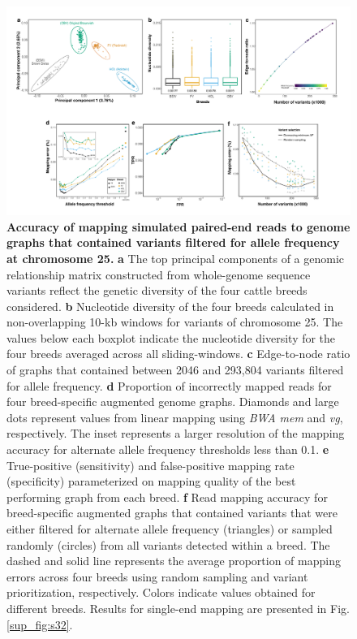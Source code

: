 \documentclass[../main.tex]{subfiles}
\begin{document}
\begin{figure}[!htb]
    \centering
    \includegraphics[width=\textwidth]{paper2/main_figure/Fig2.pdf}
    \caption[Affect allele frequency on graph mapping accuracy]{\textbf{Accuracy of mapping simulated paired-end reads to genome graphs that contained variants filtered for allele frequency at chromosome 25.} 
    \small{\textbf{a} The top principal components of a genomic relationship matrix constructed from whole-genome sequence variants reflect the genetic diversity of the four cattle breeds considered. \textbf{b} Nucleotide diversity of the four breeds calculated in non-overlapping 10-kb windows for variants of chromosome 25. The values below each boxplot indicate the nucleotide diversity for the four breeds averaged across all sliding-windows. \textbf{c} Edge-to-node ratio of graphs that contained between 2046 and 293,804 variants filtered for allele frequency. \textbf{d} Proportion of incorrectly mapped reads for four breed-specific augmented genome graphs. Diamonds and large dots represent values from linear mapping using \emph{BWA mem} and \emph{vg}, respectively. The inset represents a larger resolution of the mapping accuracy for alternate allele frequency thresholds less than 0.1. \textbf{e} True-positive (sensitivity) and false-positive mapping rate (specificity) parameterized on mapping quality of the best performing graph from each breed. \textbf{f} Read mapping accuracy for breed-specific augmented graphs that contained variants that were either filtered for alternate allele frequency (triangles) or sampled randomly (circles) from all variants detected within a breed. The dashed and solid line represents the average proportion of mapping errors across four breeds using random sampling and variant prioritization, respectively. Colors indicate values obtained for different breeds. Results for single-end mapping are presented in Fig. \ref{sup_fig:s32}.}}
    \label{fig32:freq}
\end{figure}
\end{document}

